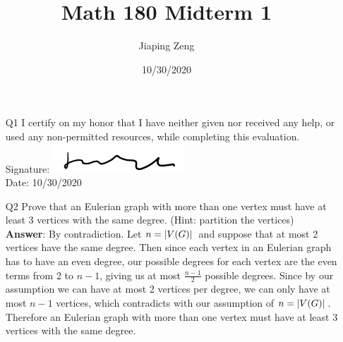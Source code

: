 \documentclass{article}
\title{Math 180 Midterm 1}
\author{Jiaping Zeng}
\date{10/30/2020}
\begin{document}

\newpage
\begin{itemize}
    \item [Q1] I certify on my honor that I have neither given nor received any help, or used any non-permitted resources, while completing this evaluation.\\
          Signature:\includegraphics[width=2in]{signature.png}\\
          Date: 10/30/2020
\end{itemize}


\newpage
\begin{itemize}
    \item [Q2] Prove that an Eulerian graph with more than one vertex must have at least 3 vertices with the same degree. (Hint: partition the vertices)\\
          \textbf{Answer}: By contradiction. Let $n=\abs*{V(G)}$ and suppose that at most 2 vertices have the same degree. Then since each vertex in an Eulerian graph has to have an even degree, our possible degrees for each vertex are the even terms from 2 to $n-1$, giving us at most $\frac{n-1}{2}$ possible degrees. Since by our assumption we can have at most 2 vertices per degree, we can only have at most $n-1$ vertices, which contradicts with our assumption of $n=\abs*{V(G)}$. Therefore an Eulerian graph with more than one vertex must have at least 3 vertices with the same degree.
\end{itemize}
\end{document}
